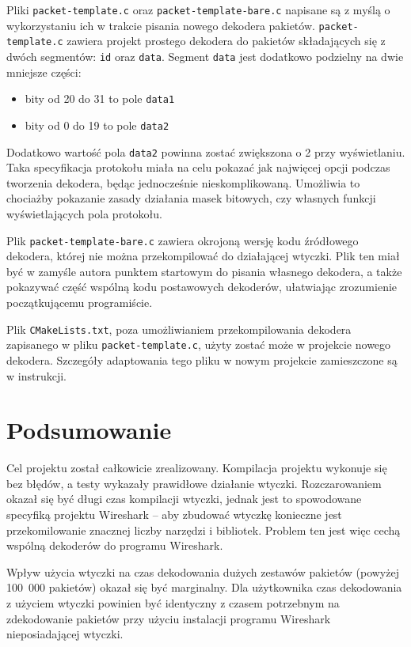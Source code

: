 \documentclass[a4paper, 11pt, twoside, openright]{article}
\begin{document}
	Pliki \texttt{packet-template.c} oraz \texttt{packet-template-bare.c} napisane są z myślą o wykorzystaniu ich w trakcie
	pisania nowego dekodera pakietów. \texttt{packet-template.c} zawiera projekt prostego dekodera do pakietów składających
	się z dwóch segmentów: \texttt{id} oraz \texttt{data}. Segment \texttt{data} jest dodatkowo podzielny na dwie mniejsze
	części:
	\begin{itemize}
		\item bity od 20 do 31 to pole \texttt{data1}
		\item bity od 0 do 19 to pole \texttt{data2}
	\end{itemize}

	Dodatkowo wartość pola \texttt{data2} powinna zostać zwiększona o 2 przy wyświetlaniu. Taka specyfikacja protokołu
	miała na celu pokazać jak najwięcej opcji podczas tworzenia dekodera, będąc jednocześnie nieskomplikowaną.
	Umożliwia to chociażby pokazanie zasady działania masek bitowych, czy własnych funkcji wyświetlających pola protokołu.

	Plik \texttt{packet-template-bare.c} zawiera okrojoną wersję kodu źródłowego dekodera, której nie można przekompilować
	do działającej wtyczki. Plik ten miał być w zamyśle autora punktem startowym do pisania własnego dekodera, a także
	pokazywać część wspólną kodu postawowych dekoderów, ułatwiając zrozumienie początkującemu programiście.

	Plik \texttt{CMakeLists.txt}, poza umożliwianiem przekompilowania dekodera zapisanego w pliku \texttt{packet-template.c},
	użyty zostać może w projekcie nowego dekodera. Szczegóły adaptowania tego pliku w nowym projekcie zamieszczone są w instrukcji.


\cleardoublepage
\section{Podsumowanie}

	\indent\par
	Cel projektu został całkowicie zrealizowany. Kompilacja projektu wykonuje się bez błędów, a testy wykazały prawidłowe działanie wtyczki.
	Rozczarowaniem okazał się być długi czas kompilacji wtyczki, jednak jest to spowodowane specyfiką projektu Wireshark -- aby zbudować
	wtyczkę konieczne jest przekomilowanie znacznej liczby narzędzi i bibliotek. Problem ten jest więc cechą wspólną dekoderów do programu
	Wireshark.

	Wpływ użycia wtyczki na czas dekodowania dużych zestawów pakietów (powyżej 100~000 pakietów) okazał się być marginalny. Dla użytkownika czas dekodowania
	z użyciem wtyczki powinien być identyczny z czasem potrzebnym na zdekodowanie pakietów przy użyciu instalacji programu Wireshark nieposiadającej wtyczki.
\end{document}
